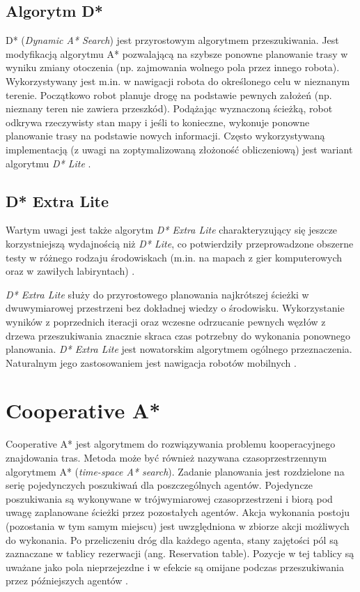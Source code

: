 \subsection{Algorytm D*}
\label{ch:dstar}
D* ({\it Dynamic A* Search}) jest przyrostowym algorytmem przeszukiwania. Jest modyfikacją algorytmu A* pozwalającą na szybsze ponowne planowanie trasy w wyniku zmiany otoczenia (np. zajmowania wolnego pola przez innego robota). Wykorzystywany jest m.in. w nawigacji robota do określonego celu w nieznanym terenie. Początkowo robot planuje drogę na podstawie pewnych założeń (np. nieznany teren nie zawiera przeszkód). Podążając wyznaczoną ścieżką, robot odkrywa rzeczywisty stan mapy i jeśli to konieczne, wykonuje ponowne planowanie trasy na podstawie nowych informacji.
Często wykorzystywaną implementacją (z uwagi na zoptymalizowaną złożoność obliczeniową) jest wariant algorytmu {\it D* Lite} \cite{dstarlite}.

\subsection{D* Extra Lite}
\label{ch:dstarextralite}
Wartym uwagi jest także algorytm {\it D* Extra Lite} charakteryzujący się jeszcze korzystniejszą wydajnością niż {\it D* Lite}, co potwierdziły przeprowadzone obszerne testy w różnego rodzaju środowiskach (m.in. na mapach z gier komputerowych oraz w zawiłych labiryntach) \cite{przybylski}.

{\it D* Extra Lite} służy do przyrostowego planowania najkrótszej ścieżki w dwuwymiarowej przestrzeni bez dokładnej wiedzy o środowisku. Wykorzystanie wyników z poprzednich iteracji oraz wczesne odrzucanie pewnych węzłów z drzewa przeszukiwania znacznie skraca czas potrzebny do wykonania ponownego planowania.
{\it D* Extra Lite} jest nowatorskim algorytmem ogólnego przeznaczenia. Naturalnym jego zastosowaniem jest nawigacja robotów mobilnych \cite{przybylski}.

\section{Cooperative A*}
\label{ch:theory-coop-astar}
Cooperative A* jest algorytmem do rozwiązywania problemu kooperacyjnego znajdowania tras.
Metoda może być również nazywana czasoprzestrzennym algorytmem A* ({\it time-space A* search}).
Zadanie planowania jest rozdzielone na serię pojedynczych poszukiwań dla poszczególnych agentów.
Pojedyncze poszukiwania są wykonywane w trójwymiarowej czasoprzestrzeni i biorą pod uwagę zaplanowane ścieżki przez pozostałych agentów.
Akcja wykonania postoju (pozostania w tym samym miejscu) jest uwzględniona w zbiorze akcji możliwych do wykonania.
Po przeliczeniu dróg dla każdego agenta, stany zajętości pól są zaznaczane w tablicy rezerwacji (ang. Reservation table).
Pozycje w tej tablicy są uważane jako pola nieprzejezdne i w efekcie są omijane podczas przeszukiwania przez późniejszych agentów \cite{cooppath}.

